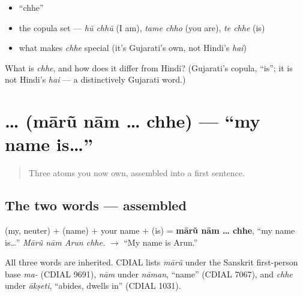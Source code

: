\begin{itemize}
\raggedright
  \item \textquotedblleft{}chhe\textquotedblright{}
  \item the copula set — \emph{hũ chhũ} (I am), \emph{tame chho} (you are), \emph{te chhe} (is)
  \item what makes \emph{chhe} special (it's Gujarati's own, not Hindi's \emph{hai})
\end{itemize}

\begin{tcolorbox}[breakable,colback=teal!4,colframe=teal!35!black,title={Before you move on}]
What is \emph{chhe}, and how does it differ from Hindi? (Gujarati's copula, \textquotedblleft{}is\textquotedblright{}; it is not Hindi's \emph{hai} — a distinctively Gujarati word.)
\end{tcolorbox}
\section[\texorpdfstring{\gu{મારું} \gu{નામ} … \gu{છે} (mārũ nām … chhe)}{મારું નામ … છે (mārũ nām … chhe)}]{  …  (mārũ nām … chhe) — \textquotedblleft{}my name is…\textquotedblright{}}

\label{lesson:GU-C02-maarun-naam-chhe}



\begin{quote}
Three atoms you now own, assembled into a first sentence.
\end{quote}

\subsection*{The two words — assembled}
\textbf{} (my, neuter) + \textbf{} (name) + your name + \textbf{} (is) = \textbf{mārũ nām … chhe}, \textquotedblleft{}my name is…\textquotedblright{} \emph{Mārũ nām Arun chhe.} $\to$ \textquotedblleft{}My name is Arun.\textquotedblright{}

\begin{cousinweb}
All three words are inherited. CDIAL lists \emph{mārũ} under the Sanskrit first-person base \emph{ma-} (CDIAL 9691), \emph{nām} under \emph{nāman}, \textquotedblleft{}name\textquotedblright{} (CDIAL 7067), and \emph{chhe} under \emph{ākṣeti}, \textquotedblleft{}abides, dwells in\textquotedblright{} (CDIAL 1031).
\end{cousinweb}

